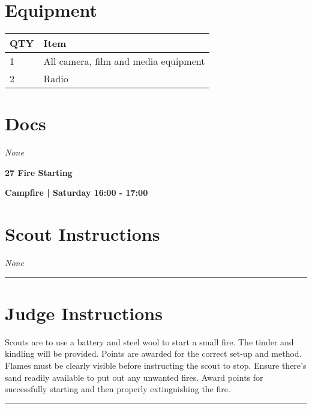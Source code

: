\documentclass[10pt]{article}
\newcommand{\newtitle}[1]{\begin{center}{\Huge\bfseries #1 }\\ \vspace{5mm}\end{center}}
\newcommand{\newsubtitle}[1]{\begin{center}{\color{grey}\Large\bfseries #1 }\\ \vspace{5mm}\end{center}}
\begin{document}
	\begin{multicols}{2}

		\section*{\faWrench \: Equipment}

		
	\begin{center}
			\begin{tabular}{p{2cm}p{4cm}}


				\textbf{QTY} & \textbf{Item} \\\toprule
												1&All camera, film and media equipment\\\midrule
												2&Radio\\\midrule
								\end{tabular}

			\end{center}

		
		\vfill\null
		\columnbreak

			\section*{\faFile \: Docs}
		 	\textit{None}
	

		\vfill\null

		\end{multicols}



	\vspace{1cm}


	\clearpage
		\newtitle{27 Fire Starting }
	\newsubtitle{Campfire | Saturday 16:00 - 17:00}
		\setcounter{section}{26}
	\section*{Scout Instructions}
		\textit{None}
	
	\vspace{0.5cm}
	\hrule
	\vspace{0.5cm}

		\section*{Judge Instructions}
		Scouts are to use a battery and steel wool to start a small fire. The tinder and kindling will be provided. Points are awarded for the correct set-up and method. Flames must be clearly visible before instructing the scout to stop. Ensure there's sand readily available to put out any unwanted fires. Award points for successfully starting and then properly extinguishing the fire.
\vspace{0.5cm}
	\hrule
	\vspace{0.5cm}
\end{document}
